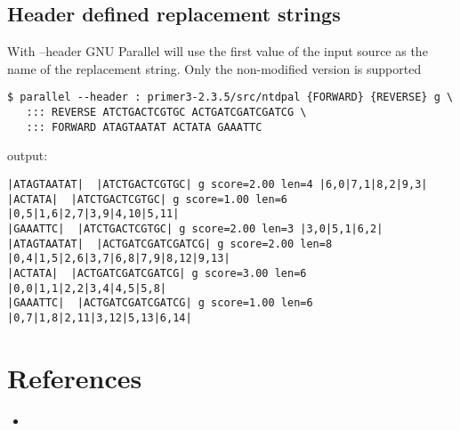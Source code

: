 \documentclass{article}
\begin{document}
\subsection{Header defined replacement strings}
With --header GNU Parallel will use the first value of the input source as the name of the replacement string. Only the non-modified version {} is supported
\begin{lstlisting}
$ parallel --header : primer3-2.3.5/src/ntdpal {FORWARD} {REVERSE} g \
   ::: REVERSE ATCTGACTCGTGC ACTGATCGATCGATCG \
   ::: FORWARD ATAGTAATAT ACTATA GAAATTC
\end{lstlisting}
output:
\begin{lstlisting}
|ATAGTAATAT|  |ATCTGACTCGTGC| g score=2.00 len=4 |6,0|7,1|8,2|9,3|
|ACTATA|  |ATCTGACTCGTGC| g score=1.00 len=6 |0,5|1,6|2,7|3,9|4,10|5,11|
|GAAATTC|  |ATCTGACTCGTGC| g score=2.00 len=3 |3,0|5,1|6,2|
|ATAGTAATAT|  |ACTGATCGATCGATCG| g score=2.00 len=8 |0,4|1,5|2,6|3,7|6,8|7,9|8,12|9,13|
|ACTATA|  |ACTGATCGATCGATCG| g score=3.00 len=6 |0,0|1,1|2,2|3,4|4,5|5,8|
|GAAATTC|  |ACTGATCGATCGATCG| g score=1.00 len=6 |0,7|1,8|2,11|3,12|5,13|6,14|
\end{lstlisting}


\section{References}
\begin{itemize}
\item{}
\end{itemize}
\end{document}

